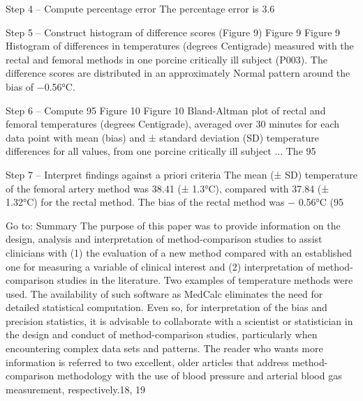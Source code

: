 \documentclass[]{article}
\begin{document}
Step 4 – Compute percentage error
The percentage error is 3.6%

Step 5 – Construct histogram of difference scores (Figure 9)
Figure 9
Figure 9
Histogram of differences in temperatures (degrees Centigrade) measured with the rectal and femoral methods in one porcine critically ill subject (P003).
The difference scores are distributed in an approximately Normal pattern around the bias of −0.56°C.

Step 6 – Compute 95%
Figure 10
Figure 10
Bland-Altman plot of rectal and femoral temperatures (degrees Centigrade), averaged over 30 minutes for each data point with mean (bias) and ± standard deviation (SD) temperature differences for all values, from one porcine critically ill subject ...
The 95%

Step 7 – Interpret findings against a priori criteria
The mean (± SD) temperature of the femoral artery method was 38.41 (± 1.3°C), compared with 37.84 (± 1.32°C) for the rectal method. The bias of the rectal method was − 0.56°C (95%

Go to:
Summary
The purpose of this paper was to provide information on the design, analysis and interpretation of method-comparison studies to assist clinicians with (1) the evaluation of a new method compared with an established one for measuring a variable of clinical interest and (2) interpretation of method-comparison studies in the literature. Two examples of temperature methods were used. The availability of such software as MedCalc eliminates the need for detailed statistical computation. Even so, for interpretation of the bias and precision statistics, it is advisable to collaborate with a scientist or statistician in the design and conduct of method-comparison studies, particularly when encountering complex data sets and patterns. The reader who wants more information is referred to two excellent, older articles that address method-comparison methodology with the use of blood pressure and arterial blood gas measurement, respectively.18, 19
\end{document}
